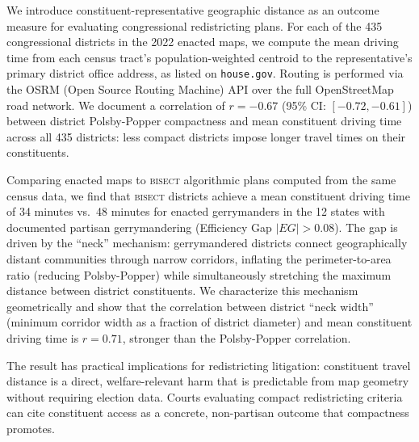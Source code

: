 We introduce constituent-representative geographic distance as an outcome measure for
evaluating congressional redistricting plans. For each of the 435 congressional districts
in the 2022 enacted maps, we compute the mean driving time from each census tract's
population-weighted centroid to the representative's primary district office address,
as listed on \texttt{house.gov}. Routing is performed via the OSRM (Open Source Routing
Machine) API over the full OpenStreetMap road network. We document a correlation of
$r = -0.67$ (95\% CI: $[-0.72, -0.61]$) between district Polsby-Popper compactness and
mean constituent driving time across all 435 districts: less compact districts impose
longer travel times on their constituents.

Comparing enacted maps to \textsc{bisect} algorithmic plans computed from the same
census data, we find that \textsc{bisect} districts achieve a mean constituent driving
time of 34 minutes vs.\ 48 minutes for enacted gerrymanders in the 12 states with
documented partisan gerrymandering (Efficiency Gap $|EG| > 0.08$). The gap is driven
by the ``neck'' mechanism: gerrymandered districts connect geographically distant
communities through narrow corridors, inflating the perimeter-to-area ratio (reducing
Polsby-Popper) while simultaneously stretching the maximum distance between district
constituents. We characterize this mechanism geometrically and show that the correlation
between district ``neck width'' (minimum corridor width as a fraction of district diameter)
and mean constituent driving time is $r = 0.71$, stronger than the Polsby-Popper
correlation.

The result has practical implications for redistricting litigation: constituent travel
distance is a direct, welfare-relevant harm that is predictable from map geometry without
requiring election data. Courts evaluating compact redistricting criteria can cite
constituent access as a concrete, non-partisan outcome that compactness promotes.
